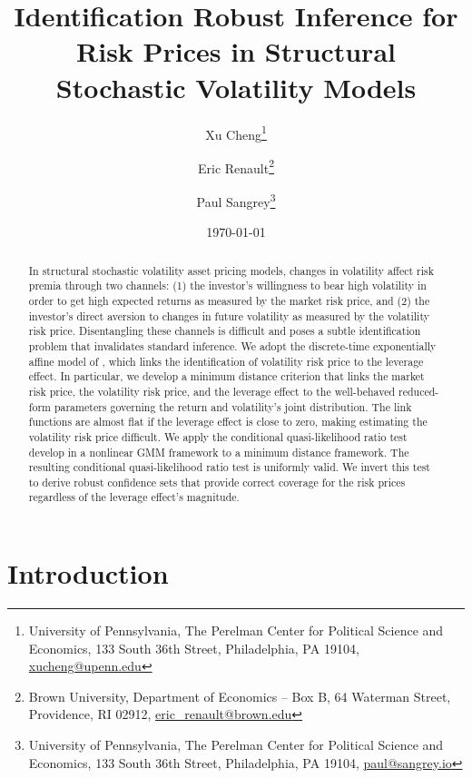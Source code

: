 \documentclass[11pt, letterpaper, twoside]{article}
\author{Xu Cheng\thanks{University of Pennsylvania, The Perelman Center for Political Science and Economics, 133 South 36th Street, Philadelphia, PA 19104, \href{mailto:xucheng@upenn.edu}{xucheng@upenn.edu}} \and Eric Renault\thanks{Brown University, Department of Economics -- Box B, 64 Waterman Street, Providence, RI 02912, \href{mailto:eric_renault@brown.edu}{eric\_renault@brown.edu}} \and Paul Sangrey\thanks{University of Pennsylvania, The Perelman Center for Political Science and Economics, 133 South 36th Street, Philadelphia, PA 19104, \href{mailto:paul@sangrey.io}{paul@sangrey.io}}}
\title{Identification Robust Inference for Risk Prices in Structural Stochastic Volatility Models}
\date{\today}
\begin{document}
\begin{titlepage}


\maketitle
\thispagestyle{empty}
\addtocounter{page}{-1}

\begin{abstract} 

\singlespacing \noindent 
In structural stochastic volatility asset pricing models, changes in volatility affect risk premia through two channels: (1) the investor's willingness to bear high volatility in order to get high expected returns as measured by the market risk price, and (2) the investor’s direct aversion to changes in future volatility as measured by the volatility risk price. Disentangling these channels is difficult and poses a subtle identification problem that invalidates standard inference. We adopt the discrete-time exponentially affine model of \textcite{han2018leverage}, which links the identification of volatility risk price to the leverage effect. In particular, we develop a minimum distance criterion that links the market risk price, the volatility risk price, and the leverage effect to the well-behaved reduced-form parameters governing the return and volatility's joint distribution. The link functions are almost flat if the leverage effect is close to zero, making estimating the volatility risk price difficult. We apply the conditional quasi-likelihood ratio test \textcite{andrews2016conditional} develop in a nonlinear GMM framework to a minimum distance framework. The resulting conditional quasi-likelihood ratio test is uniformly valid. We invert this test to derive robust confidence sets that provide correct coverage for the risk prices regardless of the leverage effect's magnitude. 

\end{abstract} 

\medskip
{}

\medskip


\end{titlepage}

\clearpage

\section{Introduction}
\end{document}
